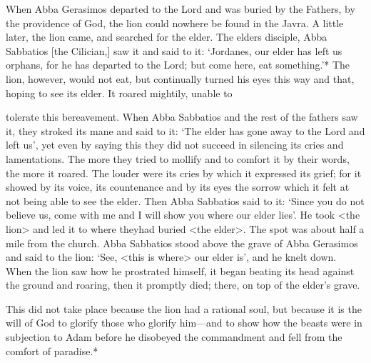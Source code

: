 When Abba Gerasimos departed to the Lord and was buried by
the Fathers, by the providence of God, the lion could nowhere be
found in the Javra. A little later, the lion came, and searched for the
elder. The elder\textquotesingle s disciple, Abba Sabbatios [the Cilician,] saw it and
said to it: `Jordanes, our elder has left us orphans, for he has
departed to the Lord; but come here, eat something.'* The lion,
however, would not eat, but continually turned his eyes this way
and that, hoping to see its elder. It roared mightily, unable to

tolerate this bereavement. When Abba Sabbatios and the rest of the
fathers saw it, they stroked its mane and said to it: `The elder has
gone away to the Lord and left us', yet even by saying this they did
not succeed in silencing its cries and lamentations. The more they
tried to mollify and to comfort it by their words, the more it roared.
The louder were its cries by which it expressed its grief; for it
showed by its voice, its countenance and by its eyes the sorrow
which it felt at not being able to see the elder. Then Abba Sabbatios
said to it: `Since you do not believe us, come with me and I will
show you where our elder lies'. He took <the lion> and led it to
where theyhad buried <the elder>. The spot was about half a mile
from the church. Abba Sabbatios stood above the grave of Abba
Gerasimos and said to the lion: `See, <this is where> our elder is',
and he knelt down. When the lion saw how he prostrated himself,
it began beating its head against the ground and roaring, then it
promptly died; there, on top of the elder's grave.

This did not take place because the lion had a rational soul, but
because it is the will of God to glorify those who glorify him—and
to show how the beasts were in subjection to Adam before he
disobeyed the commandment and fell from the comfort of paradise.*

